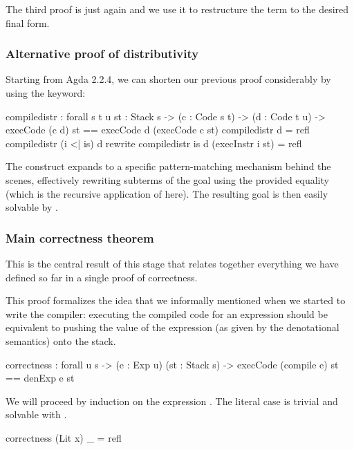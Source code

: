 The third proof is just  again and we use it to restructure the
term to the desired final form.

\subsubsection{Alternative proof of distributivity}

Starting from Agda 2.2.4, we can shorten our previous proof considerably
by using the  keyword:


\begin{code}
  compile\-distr : forall {s t u} {st : Stack s}
    -> (c : Code s t) -> (d : Code t u)
    -> execCode (c \app d) st == execCode d (execCode c st)
  compile\-distr \nil d = refl
  compile\-distr (i <| is) d rewrite compile\-distr is d (execInstr i st) = refl
\end{code}

\noindent The  construct expands to a specific pattern-matching
mechanism behind the scenes, effectively rewriting subterms of the goal using
the provided equality (which is the recursive application of
 here). The resulting goal is then easily solvable by
.

\subsubsection{Main correctness theorem}

This is the central result of this stage that relates together everything we
have defined so far in a single proof of correctness.

This proof formalizes the idea that we informally mentioned when we started to
write the compiler: executing the compiled code for an expression should be
equivalent to pushing the value of the expression (as given by the denotational
semantics) onto the stack.

\label{sec:cor-correctness}\begin{code}
  correctness : forall {u s}
    -> (e : Exp u) (st : Stack s)
    -> execCode (compile e) st == denExp e \scons st
\end{code}

\noindent We will proceed by induction on the expression . The literal
case is trivial and solvable with .

\begin{code}
  correctness (Lit x) _ = refl
\end{code}

